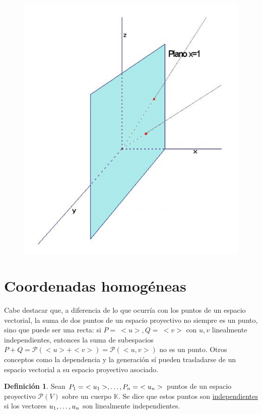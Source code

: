 \documentclass[12pt]{report}
\theoremstyle{definition}
\newtheorem{definition}{Definición}[chapter]
\theoremstyle{definition}
\theoremstyle{remark}
\begin{document}
\begin{figure}[h]
\includegraphics[scale = 0.4]{1.2_2}
\centering
\end{figure}

\section{Coordenadas homogéneas}

Cabe destacar que, a diferencia de lo que ocurría con los puntos de un espacio vectorial, la suma de dos puntos de un espacio proyectivo no siempre es un punto, sino que puede ser una recta: si $P = \ <u>, Q = \ <v>$ con $u,v$ linealmente independientes, entonces la suma de subespacios $P+Q = \mathcal{P}(<u>+<v>) = \mathcal{P}(<u,v>)$ no es un punto. Otros conceptos como la dependencia y la generación sí pueden trasladarse de un espacio vectorial a su espacio proyectivo asociado.

\begin{definition}
Sean $P_1 = \ <u_1>, \mathellipsis, P_n = \ <u_n>$ puntos de un espacio proyectivo $\mathcal{P}(V)$ sobre un cuerpo $\mathbb{K}$. Se dice que estos puntos son \ul{independientes} si los vectores $u_1,\mathellipsis,u_n$ son linealmente independientes.
\end{definition}
\end{document}
